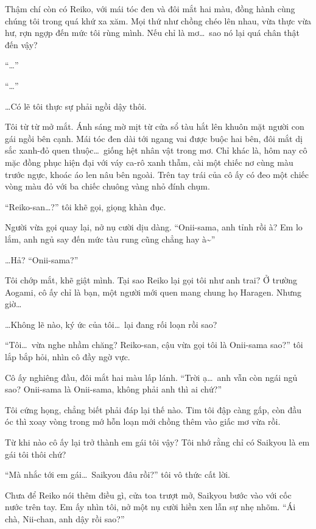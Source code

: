 \documentclass[../main.tex]{subfiles}
\begin{document}
Thậm chí còn có Reiko, với mái tóc đen và đôi mắt hai màu, đồng hành cùng chúng tôi trong quá khứ xa xăm. Mọi thứ như chồng chéo lên nhau, vừa thực vừa hư, rợn ngợp đến mức tôi rùng mình. Nếu chỉ là mơ\dots\ sao nó lại quá chân thật đến vậy?

``\dots''

``\dots''

\dots Có lẽ tôi thực sự phải ngồi dậy thôi.

Tôi từ từ mở mắt. Ánh sáng mờ mịt từ cửa sổ tàu hắt lên khuôn mặt người con gái ngồi bên cạnh. Mái tóc đen dài tới ngang vai được buộc hai bên, đôi mắt dị sắc xanh-đỏ quen thuộc\dots\ giống hệt nhân vật trong mơ. Chỉ khác là, hôm nay cô mặc đồng phục hiện đại với váy ca-rô xanh thẫm, cài một chiếc nơ cùng màu trước ngực, khoác áo len nâu bên ngoài. Trên tay trái của cô ấy có đeo một chiếc vòng màu đỏ với ba chiếc chuông vàng nhỏ đính chụm.

``Reiko-san\dots?'' tôi khẽ gọi, giọng khàn đục.

Người vừa gọi quay lại, nở nụ cười dịu dàng. ``Onii-sama, anh tỉnh rồi à? Em lo lắm, anh ngủ say đến mức tàu rung cũng chẳng hay à\~{}''

\dots Hả? ``Onii-sama?''

Tôi chớp mắt, khẽ giật mình. Tại sao Reiko lại gọi tôi như anh trai? Ở trường Aogami, cô ấy chỉ là bạn, một người mới quen mang chung họ Haragen. Nhưng giờ\dots

\dots Không lẽ nào, ký ức của tôi\dots\ lại đang rối loạn rồi sao?

``Tôi\dots\ vừa nghe nhầm chăng? Reiko-san, cậu vừa gọi tôi là Onii-sama sao?'' tôi lắp bắp hỏi, nhìn cô đầy ngờ vực.

Cô ấy nghiêng đầu, đôi mắt hai màu lấp lánh. ``Trời ạ\dots\ anh vẫn còn ngái ngủ sao? Onii-sama là Onii-sama, không phải anh thì ai chứ?''

Tôi cứng họng, chẳng biết phải đáp lại thế nào. Tim tôi đập càng gấp, còn đầu óc thì xoay vòng trong mớ hỗn loạn mới chồng thêm vào giấc mơ vừa rồi.

Từ khi nào cô ấy lại trở thành em gái tôi vậy? Tôi nhớ rằng chỉ có Saikyou là em gái tôi thôi chứ?

``Mà nhắc tới em gái\dots\ Saikyou đâu rồi?'' tôi vô thức cất lời.

Chưa để Reiko nói thêm điều gì, cửa toa trượt mở, Saikyou bước vào với cốc nước trên tay. Em ấy nhìn tôi, nở một nụ cười hiền xen  lẫn sự nhẹ nhõm. ``Ái chà, Nii-chan, anh dậy rồi sao?''
\end{document}
